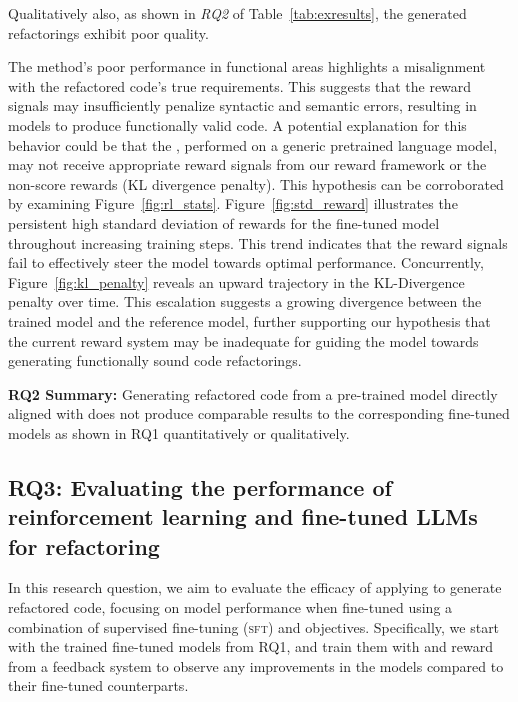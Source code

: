 Qualitatively also, as shown in \textit{RQ2} of Table~\ref{tab:exresults}, the generated refactorings exhibit poor quality. 

The \rl{} method's poor performance in functional areas highlights a misalignment with the refactored code's true requirements. This suggests that the \rl{} reward signals may insufficiently penalize syntactic and semantic errors, resulting in models 
to produce functionally valid code. A potential explanation for this behavior could be that the \rl{}, performed on a generic pretrained language model, may not receive appropriate reward signals from our reward framework or the non-score rewards (KL divergence penalty). This hypothesis can be corroborated by examining Figure~\ref{fig:rl_stats}. Figure~\ref{fig:std_reward} illustrates the persistent high standard deviation of rewards for the \rl{} fine-tuned model throughout increasing training steps. This trend indicates that the reward signals fail to effectively steer the model towards optimal performance. Concurrently, Figure~\ref{fig:kl_penalty} reveals an upward trajectory in the KL-Divergence penalty over time. This escalation suggests a growing divergence between the trained model and the reference model, further supporting our hypothesis that the current reward system may be inadequate for guiding the model towards generating functionally sound code refactorings. 


\begin{boxH}
\textbf{RQ2 Summary:} Generating refactored code from a pre-trained model directly aligned with \rl{} does not produce comparable results to the corresponding fine-tuned models as shown in RQ1 quantitatively or qualitatively.

\end{boxH}





\subsection{RQ3: Evaluating the performance of reinforcement learning and fine-tuned LLMs for refactoring} 

In this research question, we aim to evaluate the efficacy of applying \rl{} to generate refactored code, focusing on model performance when fine-tuned using a combination of supervised fine-tuning (\textsc{sft}) and \rl{} objectives.
Specifically, we start with the trained fine-tuned models from RQ1, and train them with \ppo{} and reward from a feedback system to observe any improvements in the models compared to their fine-tuned counterparts.

